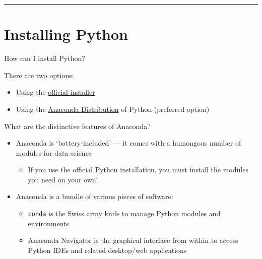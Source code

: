 \documentclass[a4paper,11pt]{book}
\newcommand{\question}[1]{%
    \begin{tcolorbox}[colback=comp_c!10,colframe=comp_c,sidebyside align=top,width=\linewidth,before skip=1ex]
        #1
    \end{tcolorbox}
    \switchcolumn%
}
\newcommand{\note}[1]{%
    \begin{tcolorbox}[colback=white!0,colframe=white!10,width=\linewidth,before skip=1ex]
        #1
    \end{tcolorbox}
}
\begin{document}
\par\noindent\rule{\textwidth}{0.4pt}

\vspace{1em}

\section{Installing Python}

\begin{paracol}{2}
	\question{\raggedright How can I install Python?}
	\note{There are two options:
	\begin{itemize}
		\item Using the \href{https://www.google.com/search?client=safari&rls=en&q=python+official+isntaller&ie=UTF-8&oe=UTF-8}{official installer}
		\item Using the \href{https://www.anaconda.com/products/distribution}{Anaconda Distribution} of Python (preferred option)
	\end{itemize}
	}
\end{paracol}

\begin{paracol}{2}
	\question{\raggedright What are the distinctive features of Anaconda?}
	\note{
	\begin{itemize}
		\item Anaconda is `battery-included' --- it comes with a humongous number of modules for data science
		\begin{itemize}
			\item If you use the official Python installation, you must install the modules you need on your own!
		\end{itemize}
		\item  Anaconda is a bundle of various pieces of software:
		\begin{itemize}
			\item \texttt{conda} is the Swiss army knife to manage Python modules and environments
			\item Anaconda Navigator is the graphical interface from within to access Python IDEs and related desktop/web applications
		\end{itemize}
	\end{itemize}
	}
\end{paracol}
\end{document}

